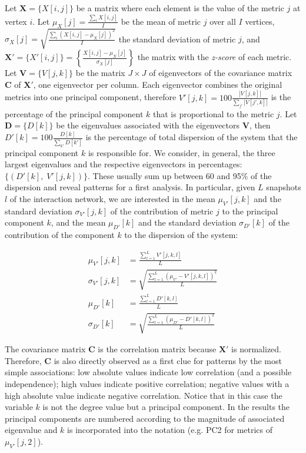 Let $\mathbf{X}=\{X[i,j]\}$ be a matrix where each element is the value
of the metric $j$ at vertex $i$.
Let
$\mu_X [j]=\frac{\sum_i X[i,j]}{I}$ be the mean of metric $j$ over all $I$ vertices, 
$\sigma_X [j]=\sqrt{\frac{\sum_i (X[i,j]-\mu_X [j])^2}{I}}$ the standard deviation of metric $j$,
and $\mathbf{X'}=\{X'[i,j]\}=\left\{\frac{X[i,j]-\mu_X[j]}{\sigma_X[j]}\right\}$ 
the matrix with the \emph{z-score} of each metric. 
Let $\mathbf{V}=\{V[j,k]\}$ be the matrix $J\times J$ of eigenvectors
of the covariance matrix $\mathbf{C}$
of $\mathbf{X'}$, one eigenvector per column.
Each eigenvector combines the original metrics into one principal component, therefore
$V'[j,k]=100\frac{|V[j,k]|}{\sum_{j'} |V[j',k]|}$
is the percentage of the principal component $k$
that is proportional to the metric $j$.
Let $\mathbf{D}=\{D[k]\}$ be the eigenvalues associated with the eigenvectors $\mathbf{V}$,
then $D'[k]=100\frac{D[k]}{\sum_{k'}D[k']}$
is the percentage of total dispersion of the system that the principal component $k$
is responsible for.
We consider, in general, the three largest eigenvalues and
the respective eigenvectors in percentages:
$\{(D'[k],\;V'[j,k])\}$.
These usually sum up between 60 and 95\% of the dispersion
and reveal patterns for a first analysis.
In particular, 
given $L$ snapshots $l$ of the interaction network,
we are interested in the mean
$\mu_{V'}[j,k]$
and the standard deviation $\sigma_{V'}[j,k]$ 
of the contribution of metric $j$ to the principal component $k$,
and the mean
$\mu_{D'}[k]$
and the standard deviation 
$\sigma_{D'}[k]$
of the contribution of the component $k$ to the dispersion
of the system:

\begin{align}\label{eq:pca}
\mu_{V'}[j,k]   &=\frac{\sum_{l=1}^L V'[j,k,l]}{L}\nonumber\\
\sigma_{V'}[j,k]&=\sqrt{\frac{\sum_{l=1}^L (\mu_{V'}-V'[j,k,l])^2}{L}}\\\nonumber
\mu_{D'}[k]&=\frac{\sum_{l=1}^L D'[k,l]}{L}\\\nonumber
\sigma_{D'}[k]&=\sqrt{\frac{\sum_{l=1}^L (\mu_{D'}-D'[k,l])^2}{L}}
\end{align}

The covariance matrix 
$\mathbf{C}$ is the correlation matrix because $\mathbf{X'}$ is normalized.
Therefore, $\mathbf{C}$ is also directly observed as a first clue for patterns
by the most simple associations:
low absolute values indicate low correlation (and a possible independence);
high values indicate positive correlation;
negative values with a high absolute value indicate negative correlation.
Notice that in this case the variable $k$ is not the degree value
but a principal component.
In the results the principal components are numbered
according to the magnitude of associated eigenvalue and $k$ is incorporated into
the notation (e.g. PC2 for metrics of $\mu_{V'}[j,2]$).


